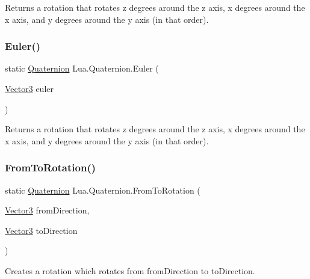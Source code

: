 Returns a rotation that rotates z degrees around the z axis, x degrees around the x axis, and y degrees around the y axis (in that order). 

\mbox{\label{class_lua_1_1_quaternion_a275393364a6f1475566b7bfe49dad51e}} 
\subsubsection{\texorpdfstring{Euler()}{Euler()}\hspace{0.1cm}{\footnotesize\ttfamily [2/2]}}
{\footnotesize\ttfamily static \mbox{\hyperlink{class_lua_1_1_quaternion}{Quaternion}} Lua.\+Quaternion.\+Euler (\begin{DoxyParamCaption}\item[{\mbox{\hyperlink{class_lua_1_1_vector3}{Vector3}}}]{euler }\end{DoxyParamCaption})\hspace{0.3cm}{\ttfamily [static]}}



Returns a rotation that rotates z degrees around the z axis, x degrees around the x axis, and y degrees around the y axis (in that order). 

\mbox{\label{class_lua_1_1_quaternion_a78b8152d55e05c4b35a74ed09eae9d41}} 
\subsubsection{\texorpdfstring{FromToRotation()}{FromToRotation()}}
{\footnotesize\ttfamily static \mbox{\hyperlink{class_lua_1_1_quaternion}{Quaternion}} Lua.\+Quaternion.\+From\+To\+Rotation (\begin{DoxyParamCaption}\item[{\mbox{\hyperlink{class_lua_1_1_vector3}{Vector3}}}]{from\+Direction,  }\item[{\mbox{\hyperlink{class_lua_1_1_vector3}{Vector3}}}]{to\+Direction }\end{DoxyParamCaption})\hspace{0.3cm}{\ttfamily [static]}}



Creates a rotation which rotates from from\+Direction to to\+Direction. 

